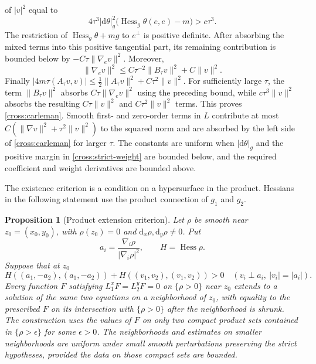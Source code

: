 \documentclass[11pt,a4paper]{article}
\newtheorem{proposition}[theorem]{Proposition}
\theoremstyle{definition}
\theoremstyle{remark}
\newcommand{\dd}{\mathrm d}
\numberwithin{equation}{section}
\begin{document}
of $|v|^2$ equal to
\[
 4\tau^3|\dd\theta|_g^2
       \big(\operatorname{Hess}_g\theta(e,e)-m\big)>c\tau^3.
\]
The restriction of $\operatorname{Hess}_g\theta+mg$ to
$e^\perp$ is positive definite. After absorbing the mixed terms into
this positive tangential part, its remaining contribution is bounded
below by $-C\tau\|\nabla_e v\|^2$. Moreover,
\[
 \|\nabla_e v\|^2
 \le C\tau^{-2}\|B_\tau v\|^2+C\|v\|^2.
\]
Finally
$|4m\tau(A_\tau v,v)|\le\tfrac12\|A_\tau v\|^2+
C\tau^2\|v\|^2$.
For sufficiently large $\tau$, the term $\|B_\tau v\|^2$ absorbs
$C\tau\|\nabla_e v\|^2$ using the preceding bound, while
$c\tau^3\|v\|^2$ absorbs the resulting $C\tau\|v\|^2$ and
$C\tau^2\|v\|^2$ terms. This proves \eqref{cross:carleman}.
Smooth first- and zero-order terms in $L$ contribute at most
$C(\|\nabla v\|^2+\tau^2\|v\|^2)$ to the squared norm and are
absorbed by the left side of \eqref{cross:carleman} for larger $\tau$.
The constants are uniform when $|\dd\theta|_g$ and the positive
margin in \eqref{cross:strict-weight} are bounded below, and the
required coefficient and weight derivatives are bounded above.

The existence criterion is a condition on a hypersurface in the
product.  Hessians in the following statement use the product
connection of $g_1$ and $g_2$.

\begin{proposition}[Product extension criterion]\label{cross:criterion}
Let $\rho$ be smooth near $z_0=(x_0,y_0)$, with $\rho(z_0)=0$ and
$\dd_x\rho,\dd_y\rho\ne0$.  Put
\[
 a_i=\frac{\nabla_i\rho}{|\nabla_i\rho|^2},\qquad H=\operatorname{Hess}\rho.
\]
Suppose that at $z_0$
\begin{equation}\label{cross:hessian-test}
 H((a_1,-a_2),(a_1,-a_2))
 +H((v_1,v_2),(v_1,v_2))>0
 \quad
 \left(v_i\perp a_i,\ |v_i|=|a_i|\right).
\end{equation}
Every function $F$ satisfying $L_1^xF=L_2^yF=0$ on
$\{\rho>0\}$ near $z_0$ extends to a solution of the same two
equations on a neighborhood of $z_0$, with equality to the prescribed
$F$ on its intersection with $\{\rho>0\}$ after the neighborhood
is shrunk. The construction uses the values of $F$ on only two
compact product sets contained in $\{\rho>\epsilon\}$ for some
$\epsilon>0$.
The neighborhoods and estimates on smaller neighborhoods are uniform
under small smooth perturbations preserving the strict hypotheses,
provided the data on those compact sets are bounded.
\end{proposition}
\end{document}
